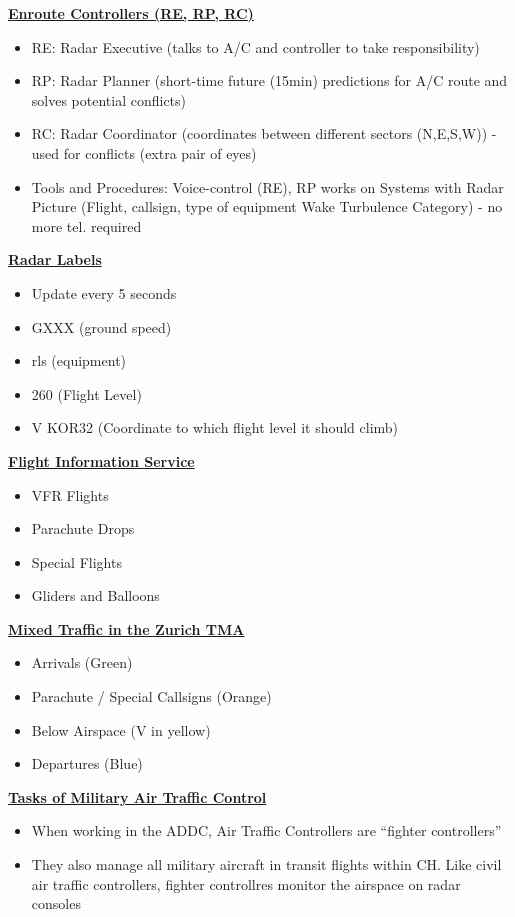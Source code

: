 \documentclass[9pt, landscape, fleqn]{scrartcl}
\begin{document}
\begin{multicols*}{3}
\begin{itemize}
\end{itemize}
\underline{\textbf{Enroute Controllers (RE, RP, RC)}}
\begin{itemize}
    \item RE: Radar Executive (talks to A/C and controller to take responsibility)
    \item RP: Radar Planner (short-time future (15min) predictions for A/C route and solves potential conflicts)
    \item RC: Radar Coordinator (coordinates between different sectors (N,E,S,W)) - used for conflicts (extra pair of eyes)
    \item Tools and Procedures: Voice-control (RE), RP works on Systems with Radar Picture (Flight, callsign, type of equipment Wake Turbulence Category) - no more tel. required 
\end{itemize}
\underline{\textbf{Radar Labels}}
\begin{itemize}
    \item Update every 5 seconds 
    \item GXXX (ground speed)
    \item rls (equipment)
    \item 260 (Flight Level)
    \item V KOR32 (Coordinate to which flight level it should climb)
\end{itemize}
\underline{\textbf{Flight Information Service}}
\begin{itemize}
    \item VFR Flights 
    \item Parachute Drops 
    \item Special Flights
    \item Gliders and Balloons 
\end{itemize}
\underline{\textbf{Mixed Traffic in the Zurich TMA}}
\begin{itemize}
    \item Arrivals (Green)
    \item Parachute / Special Callsigns (Orange)
    \item Below Airspace (V in yellow)
    \item Departures (Blue)
\end{itemize}
\underline{\textbf{Tasks of Military Air Traffic Control}}
\begin{itemize}
    \item When working in the ADDC, Air Traffic Controllers are ``fighter controllers''
    \item They also manage all military aircraft in transit flights within CH. Like civil air traffic controllers, fighter controllres monitor the airspace on radar consoles 

\end{itemize}
\end{multicols*}
\end{document}
